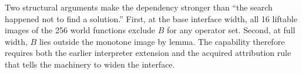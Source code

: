 Two structural arguments make the dependency stronger than ``the search happened not to find a solution.'' First, at the base interface width, all 16 liftable images of the 256 world functions exclude $B$ for any operator set. Second, at full width, $B$ lies outside the monotone image by lemma. The capability therefore requires both the earlier interpreter extension and the acquired attribution rule that tells the machinery to widen the interface.
